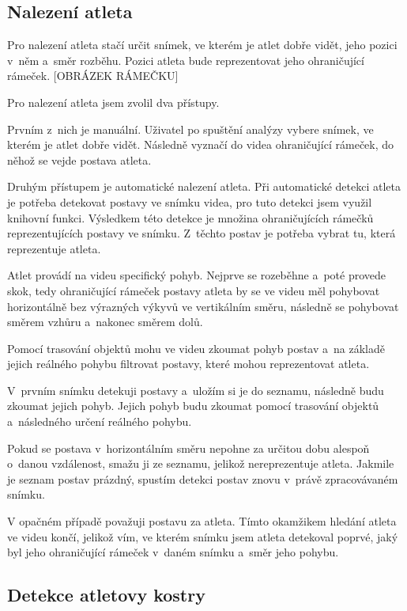 \subsection{Nalezení atleta}

Pro nalezení atleta stačí určit snímek, ve kterém je atlet dobře vidět, jeho pozici v~něm a~směr rozběhu. Pozici atleta bude reprezentovat jeho ohraničující rámeček. [OBRÁZEK RÁMEČKU]

Pro nalezení atleta jsem zvolil dva přístupy.

Prvním z~nich je manuální. Uživatel po spuštění analýzy vybere snímek, ve kterém je atlet dobře vidět. Následně vyznačí do videa ohraničující rámeček, do něhož se vejde postava atleta.

Druhým přístupem je automatické nalezení atleta. Při automatické detekci atleta je potřeba detekovat postavy ve snímku videa, pro tuto detekci jsem využil knihovní funkci. Výsledkem této detekce je množina ohraničujících rámečků reprezentujících postavy ve snímku. Z~těchto postav je potřeba vybrat tu, která reprezentuje atleta.

Atlet provádí na videu specifický pohyb. Nejprve se rozeběhne a~poté provede skok, tedy ohraničující rámeček postavy atleta by se ve videu měl pohybovat horizontálně bez výrazných výkyvů ve vertikálním směru, následně se pohybovat směrem vzhůru a~nakonec směrem dolů.

Pomocí trasování objektů mohu ve videu zkoumat pohyb postav a~na základě jejich reálného pohybu filtrovat postavy, které mohou reprezentovat atleta.

V~prvním snímku detekuji postavy a~uložím si je do seznamu, následně budu zkoumat jejich pohyb. Jejich pohyb budu zkoumat pomocí trasování objektů a~následného určení reálného pohybu.

Pokud se postava v~horizontálním směru nepohne za určitou dobu alespoň o~danou vzdálenost, smažu ji ze seznamu, jelikož nereprezentuje atleta. Jakmile je seznam postav prázdný, spustím detekci postav znovu v~právě zpracovávaném snímku.

V opačném případě považuji postavu za atleta. Tímto okamžikem hledání atleta ve videu končí, jelikož vím, ve kterém snímku jsem atleta detekoval poprvé, jaký byl jeho ohraničující rámeček v~daném snímku a~směr jeho pohybu.

\subsection{Detekce atletovy kostry}
\label{ssec:kostra}

